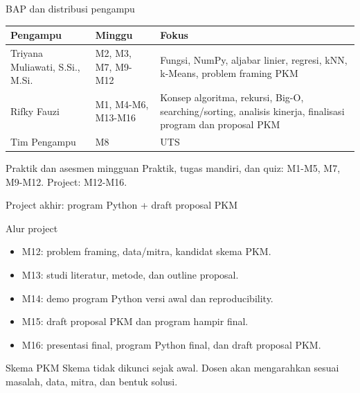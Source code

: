 \documentclass[aspectratio=169,11pt]{beamer}
\begin{document}
\begin{frame}{BAP dan distribusi pengampu}
\small
\begin{tabular}{p{3.5cm}p{3.2cm}p{5.0cm}}
\toprule
Pengampu & Minggu & Fokus \\
\midrule
Triyana Muliawati, S.Si., M.Si. & M2, M3, M7, M9-M12 & Fungsi, NumPy, aljabar linier, regresi, kNN, k-Means, problem framing PKM \\
Rifky Fauzi & M1, M4-M6, M13-M16 & Konsep algoritma, rekursi, Big-O, searching/sorting, analisis kinerja, finalisasi program dan proposal PKM \\
Tim Pengampu & M8 & UTS \\
\bottomrule
\end{tabular}
\vspace{3mm}
\begin{block}{Praktik dan asesmen mingguan}
Praktik, tugas mandiri, dan quiz: M1-M5, M7, M9-M12. Project: M12-M16.
\end{block}
\end{frame}

\begin{frame}{Project akhir: program Python + draft proposal PKM}
\begin{block}{Alur project}
\begin{itemize}
  \item M12: problem framing, data/mitra, kandidat skema PKM.
  \item M13: studi literatur, metode, dan outline proposal.
  \item M14: demo program Python versi awal dan reproducibility.
  \item M15: draft proposal PKM dan program hampir final.
  \item M16: presentasi final, program Python final, dan draft proposal PKM.
\end{itemize}
\end{block}
\begin{block}{Skema PKM}
Skema tidak dikunci sejak awal. Dosen akan mengarahkan sesuai masalah, data, mitra, dan bentuk solusi.
\end{block}
\end{frame}
\end{document}
